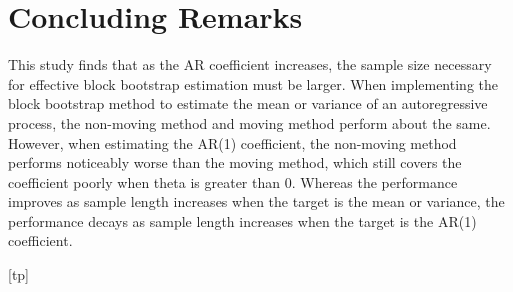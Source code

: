 \documentclass[12pt, letterpaper, titlepage]{article}
\begin{document}
\section{Concluding Remarks}
\label{sec:conremarks}

This study finds that as the AR coefficient increases, the sample size necessary for effective block bootstrap estimation must be larger. When implementing the block bootstrap method to estimate the mean or variance of an autoregressive process, the non-moving method and moving method perform about the same. However, when estimating the AR(1) coefficient, the non-moving method performs noticeably worse than the moving method, which still covers the coefficient poorly when theta is greater than 0. Whereas the performance improves as sample length increases when the target is the mean or variance, the performance decays as sample length increases when the target is the AR(1) coefficient.



[tp]
\end{document}
